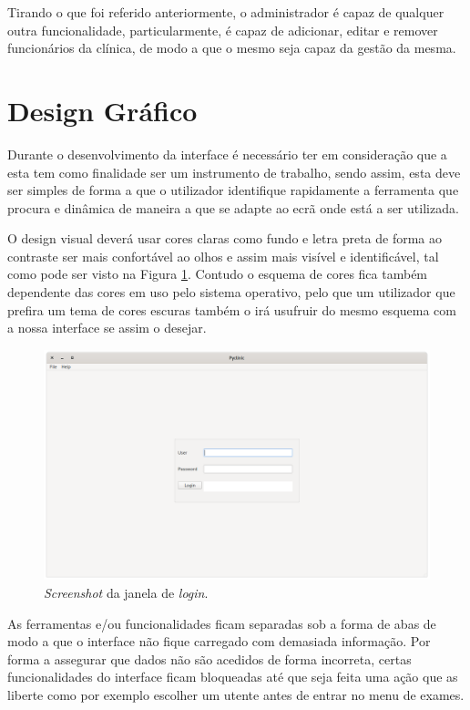 \documentclass[11pt,a4paper,twoside]{report}
\begin{document}
	Tirando o que foi referido anteriormente, o administrador é capaz de qualquer outra funcionalidade, particularmente, é capaz de adicionar, editar e remover funcionários da clínica, de modo a que o mesmo seja capaz da gestão da mesma.
	
\section{Design Gráfico}

	Durante o desenvolvimento da interface é necessário ter em consideração que a esta tem como finalidade ser um instrumento de trabalho, sendo assim, esta deve ser simples de forma a que o utilizador identifique rapidamente a ferramenta que procura e dinâmica de maneira a que se adapte ao ecrã onde está a ser utilizada.
	
	O design visual deverá usar cores claras como fundo e letra preta de forma ao contraste ser mais confortável ao olhos e assim mais visível e identificável\cite{bauer1980improving}, tal como pode ser visto na Figura \ref{fig:PyClinic_login}.
	Contudo o esquema de cores fica também dependente das cores em uso pelo sistema operativo, pelo que um utilizador que prefira um tema de cores escuras também o irá usufruir do mesmo esquema com a nossa interface se assim o desejar.
	
	\begin{figure}[H]
		\centering
		\includegraphics[width=0.8\linewidth]{image/login}
		\caption{\textit{Screenshot} da janela de \textit{login}.}
		\label{fig:PyClinic_login}
	\end{figure}
	
	As ferramentas e/ou funcionalidades ficam separadas sob a forma de abas de modo a que o interface não fique carregado com demasiada informação.
	Por forma a assegurar que dados não são acedidos de forma incorreta, certas funcionalidades do interface ficam bloqueadas até que seja feita uma ação que as liberte como por exemplo escolher um utente antes de entrar no menu de exames.
	
\end{document}
